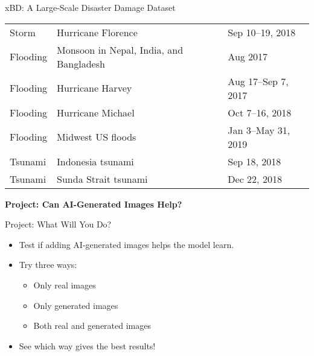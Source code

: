 \begin{refsection}
\begin{frame}{xBD: A Large-Scale Disaster Damage Dataset}
\begin{minipage}{0.55\linewidth}
\begin{tabular}{lll}
        Storm & Hurricane Florence & Sep 10--19, 2018 \\
        Flooding & Monsoon in Nepal, India, and Bangladesh & Aug 2017 \\
        Flooding & Hurricane Harvey & Aug 17--Sep 7, 2017 \\
        Flooding & Hurricane Michael & Oct 7--16, 2018 \\
        Flooding & Midwest US floods & Jan 3--May 31, 2019 \\
        Tsunami & Indonesia tsunami & Sep 18, 2018 \\
        Tsunami & Sunda Strait tsunami & Dec 22, 2018 \\
        \hline
      \end{tabular}
      \vspace{0.5em}

    \end{minipage}
    \bottomleftrefs
  \end{frame}
\end{refsection}

\begin{frame}
  \centering
  \vspace{2.5cm}
  {\LARGE \textbf{Project: Can AI-Generated Images Help?}}
\end{frame}

\begin{refsection}
\begin{frame}{Project: What Will You Do?}
  \begin{itemize}
    \item Test if adding AI-generated images helps the model learn.
    \item Try three ways:
      \begin{itemize}
        \item Only real images
        \item Only generated images
        \item Both real and generated images
      \end{itemize}
    \item See which way gives the best results!
  \end{itemize}
\end{frame}
\end{refsection}

